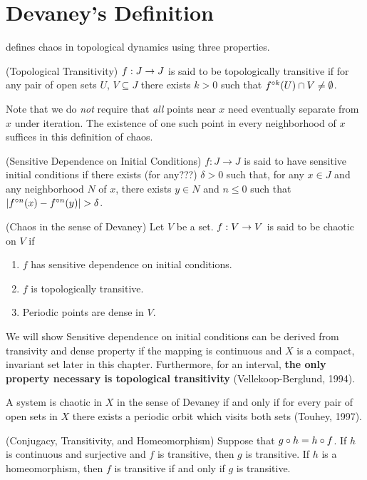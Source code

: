 \documentclass[12pt,draft,twoside]{book}
\begin{document}
\chapter{Devaney's Definition}
\citet{devaney} defines chaos in topological dynamics using three properties.

\begin{definition}
  (Topological Transitivity) 
  $f: J \rightarrow J$ is said to be topologically transitive if for any pair of open sets $U$, $V \subseteq J$ there exists $k > 0$ such that $f^{\circ k}(U) \cap V \neq \emptyset$.
  \label{defn:transitivity}
\end{definition}

Note that we do \textit{not} require that \textit{all} points near $x$ need eventually separate from $x$ under iteration.
The existence of one such point in every neighborhood of $x$ suffices in this definition of chaos.

\begin{definition}
  (Sensitive Dependence on Initial Conditions) 
  $f: J \rightarrow J$ is said to have sensitive initial conditions if there exists (for any???) $\delta > 0$
  such that, for any $x \in J$ and any neighborhood $N$ of $x$,
  there exists $y\in N$ and $n\leq 0$ such that $|\itr{f}{n}(x) - \itr{f}{n}(y)|>\delta$.
  \label{defn:sdic}
\end{definition}

\begin{definition}
  (Chaos in the sense of Devaney) 
  Let $V$ be a set.
  $f: V\rightarrow V$ is said to be chaotic on $V$ if
  \begin{enumerate}
    \item $f$ has sensitive dependence on initial conditions.
    \item $f$ is topologically transitive.
    \item Periodic points are dense in $V$.
  \end{enumerate}
\end{definition}


We will show Sensitive dependence on initial conditions can be derived from transivity and dense property if the mapping is continuous and $X$ is a compact, invariant set later in this chapter. \citep{banks}
Furthermore, for an interval, \textbf{the only property necessary is
topological transitivity} (Vellekoop-Berglund, 1994).

A system is chaotic in $X$ in the sense of Devaney if and only if
for every pair of open sets in $X$ there exists a periodic orbit 
which visits both sets (Touhey, 1997).


\begin{proposition}
  (Conjugacy, Transitivity, and Homeomorphism) 
  Suppose that $g \circ h = h \circ f$. If $h$ is continuous and
  surjective and $f$ is transitive, then $g$ is transitive.
  If $h$ is a homeomorphism, then $f$ is transitive if and only if
  $g$ is transitive.
\end{proposition}




\printindex
\end{document}

